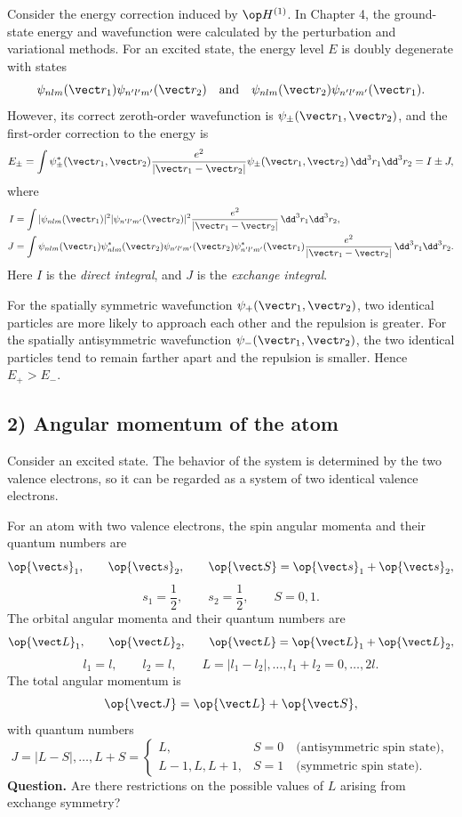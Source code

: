 Consider the energy correction induced by $\op H^{(1)}$. In Chapter 4, the ground-state energy and wavefunction were calculated by the perturbation and variational methods. For an excited state, the energy level $E$ is doubly degenerate with states
\[\psi_{nlm}(\vect r_1)\psi_{n'l'm'}(\vect r_2)
\quad\text{and}\quad
\psi_{nlm}(\vect r_2)\psi_{n'l'm'}(\vect r_1).\]
However, its correct zeroth-order wavefunction is $\psi_\pm(\vect r_1,\vect r_2)$, and the first-order correction to the energy is
\[E_\pm=\int\psi_\pm^*(\vect r_1,\vect r_2)
\frac{e^2}{|\vect r_1-\vect r_2|}
\psi_\pm(\vect r_1,\vect r_2)
\,\dd^3r_1\dd^3r_2=I\pm J,\]
where
\begin{align*}
I&=\int|\psi_{nlm}(\vect r_1)|^2
|\psi_{n'l'm'}(\vect r_2)|^2
\frac{e^2}{|\vect r_1-\vect r_2|}\,
\dd^3r_1\dd^3r_2,\\
J&=\int\psi_{nlm}(\vect r_1)\psi_{nlm}^*(\vect r_2)
\psi_{n'l'm'}(\vect r_2)\psi_{n'l'm'}^*(\vect r_1)
\frac{e^2}{|\vect r_1-\vect r_2|}\,
\dd^3r_1\dd^3r_2.
\end{align*}
Here $I$ is the \emph{direct integral}, and $J$ is the \emph{exchange integral}.

For the spatially symmetric wavefunction $\psi_+(\vect r_1,\vect r_2)$, two identical particles are more likely to approach each other and the repulsion is greater. For the spatially antisymmetric wavefunction $\psi_-(\vect r_1,\vect r_2)$, the two identical particles tend to remain farther apart and the repulsion is smaller. Hence $E_+>E_-$.

\subsection*{2) Angular momentum of the atom}
Consider an excited state. The behavior of the system is determined by the two valence electrons, so it can be regarded as a system of two identical valence electrons.

For an atom with two valence electrons, the spin angular momenta and their quantum numbers are
\[\op{\vect s}_1,\qquad\op{\vect s}_2,\qquad
\op{\vect S}=\op{\vect s}_1+\op{\vect s}_2,\]
\[s_1=\frac12,\qquad s_2=\frac12,\qquad S=0,1.\]
The orbital angular momenta and their quantum numbers are
\[\op{\vect L}_1,\qquad\op{\vect L}_2,\qquad
\op{\vect L}=\op{\vect L}_1+\op{\vect L}_2,\]
\[l_1=l,\qquad l_2=l,\qquad
L=|l_1-l_2|,\ldots,l_1+l_2=0,\ldots,2l.\]
The total angular momentum is
\[\op{\vect J}=\op{\vect L}+\op{\vect S},\]
with quantum numbers
\[
J=|L-S|,\ldots,L+S
=\begin{cases}
L,&S=0\quad\text{(antisymmetric spin state)},\\
L-1,L,L+1,&S=1\quad\text{(symmetric spin state)}.
\end{cases}
\]
\textbf{Question.} Are there restrictions on the possible values of $L$ arising from exchange symmetry?


